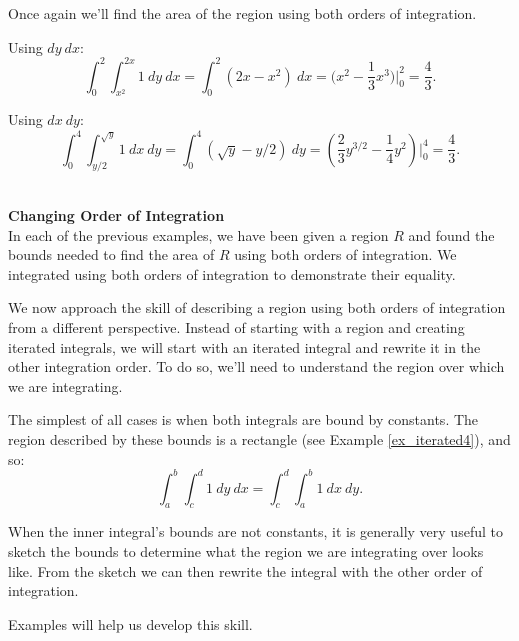 {Once again we'll find the area of the region using both orders of integration. 

Using $dy\ dx$:
$$\int_0^2\int_{x^2}^{2x}1\ dy \ dx = \int_0^2(2x-x^2)\ dx = \big(x^2-\frac13x^3\big)\Big|_0^2 = \frac43.$$

Using $dx\ dy$:
$$\int_0^4\int_{y/2}^{\sqrt{y}} 1\ dx\ dy = \int_0^4 (\sqrt{y}-y/2)\ dy = \left(\frac23y^{3/2} - \frac14y^2\right)\Big|_0^4 = \frac43.$$
\baselineskip
}\\

\noindent \textbf{\large Changing Order of Integration}\\

In each of the previous examples, we have been given a region $R$ and found the bounds needed to find the area of $R$ using both orders of integration. We integrated using both orders of integration to demonstrate their equality.

We now approach the skill of describing a region using both orders of integration from a different perspective. Instead of starting with a region and creating iterated integrals, we will start with an iterated integral and rewrite it in the other integration order. To do so, we'll need to understand the region over which we are integrating.

The simplest of all cases is when both integrals are bound by constants. The region described by these bounds is a rectangle (see Example \ref{ex_iterated4}), and so:
$$\int_a^b\int_c^d 1\ dy\ dx = \int_c^d\int_a^b1\ dx\ dy.$$

When the inner integral's bounds are not constants, it is generally very useful to sketch the bounds to determine what the region we are integrating over looks like. From the sketch we can then rewrite the integral with the other order of integration.

Examples will help us develop this skill.\\

